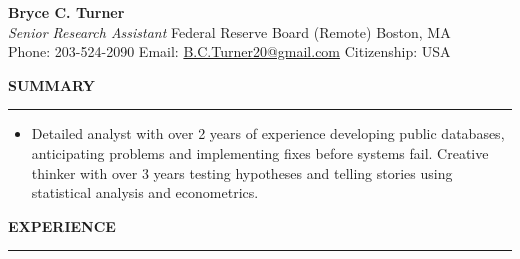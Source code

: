 \documentclass[10pt]{article} %
\begin{document}


\begin{center}
{\LARGE\bfseries Bryce C. Turner} \\%
\emph{Senior Research Assistant} {\textbullet} Federal Reserve Board (Remote) {\textbullet} Boston, MA\\

Phone: 203-524-2090 {\textbullet} Email: \href{mailto: BCTurner20@gmail.com}{B.C.Turner20@gmail.com}  {\textbullet}   Citizenship: USA \\ 
\end{center}

\smallskip

\smallskip
\MakeUppercase{\bf Summary}
\smallskip
\hrule
\smallskip
\begin{itemize}[topsep=3pt,itemsep= 2pt,partopsep=0pt, parsep= 0pt, leftmargin = *]
\item[] Detailed analyst with over 2 years of experience developing public databases, anticipating problems and implementing fixes before systems fail. Creative thinker with over 3 years testing hypotheses and telling stories using statistical analysis and econometrics.
\end{itemize}

\MakeUppercase{\bf Experience}
\smallskip
\hrule
% 
\end{document}
